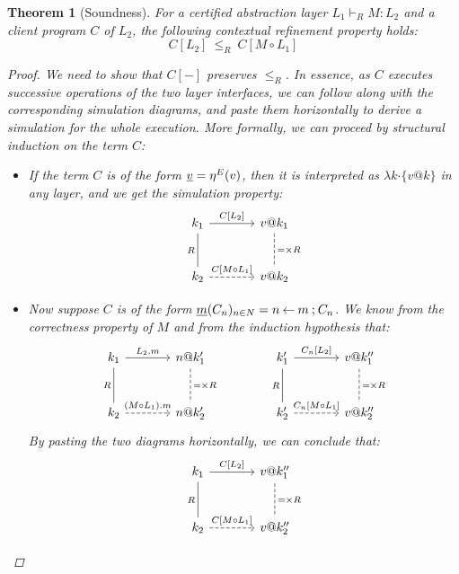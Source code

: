 \documentclass[11pt,oneside]{book}
\newtheorem{theorem}{Theorem}[chapter]
\theoremstyle{definition}
\newcommand{\bdot}{\boldsymbol{\cdot}}
\newcommand{\ul}[1]{%
  \underline{\smash{#1}}
}
\begin{document}
\begin{theorem}[Soundness] %
For a certified abstraction layer $L_1 \vdash_R M : L_2$
and a client program $C$ of $L_2$,
the following \emph{contextual refinement} property holds:
\[
  C[L_2] \: \le_R \: C[M \circ L_1]
\]
\begin{proof}
We need to show that $C[-]$ preserves $\le_R$.
In essence,
as $C$ executes successive operations of
the two layer interfaces,
we can follow along with the corresponding
simulation diagrams,
and paste them horizontally to derive a simulation
for the whole execution.
More formally,
we can proceed
by structural induction on the term $C$:
\begin{itemize}
  \item
    If the term $C$ is of the form $\ul{v} = \eta^E(v)$,
    then it is interpreted as $\lambda k \bdot \{v@k\}$
    in any layer,
    and we get the simulation property:
    \[
      \begin{tikzcd}[sep=large]
        k_1 \ar[r, "{C[L_2]}"] \ar[d, "R"', dash] &
        v@k_1 \ar[d, "{=} \times R", dash, dashed] \\
        k_2 \ar[r, "{C[M \circ L_1]}", dashed] &
        v@k_2
      \end{tikzcd}
    \]
  \item
    Now suppose $C$ is of the form
    $\ul{m}(C_n)_{n \in N} = n \mathbin\leftarrow m \mathbin; C_n$.
    We know from the correctness property of $M$ and
    from the induction hypothesis that:
    \[
      \begin{tikzcd}[sep=large]
        k_1 \ar[r, "L_2.m"] \ar[d, "R"', dash] &
        n@k_1' \ar[d, "{=} \times R", dash, dashed] \\
        k_2 \ar[r, "(M \circ L_1).m", dashed] &
        n@k_2'
      \end{tikzcd}
      \qquad \qquad
      \begin{tikzcd}[sep=large]
        k_1' \ar[r, "{C_n[L_2]}"] \ar[d, "R"', dash] &
        v@k_1'' \ar[d, "{=} \times R", dash, dashed] \\
        k_2' \ar[r, "{C_n[M \circ L_1]}", dashed] &
        v@k_2''
      \end{tikzcd}
    \]
    By pasting the two diagrams horizontally,
    we can conclude that:
    \[
      \begin{tikzcd}[sep=large]
        k_1 \ar[r, "{C[L_2]}"] \ar[d, "R"', dash] &
        v@k_1'' \ar[d, "{=} \times R", dash, dashed] \\
        k_2 \ar[r, "{C[M \circ L_1]}", dashed] &
        v@k_2''
      \end{tikzcd}
    \]
\end{itemize}
\end{proof}
\end{theorem}
\end{document}
